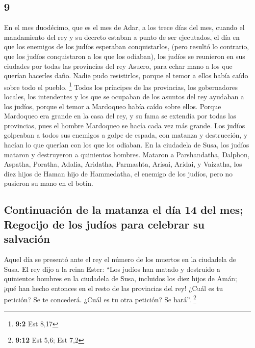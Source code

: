 \begin{paracol}{2}
\hypertarget{section-16}{%
\section{9}\label{section-16}}

 En el mes duodécimo, que es el mes de Adar, a los trece
días del mes, cuando el mandamiento del rey y su decreto estaban a punto
de ser ejecutados, el día en que los enemigos de los judíos esperaban
conquistarlos, (pero resultó lo contrario, que los judíos conquistaron a
los que los odiaban),  los judíos se reunieron en sus
ciudades por todas las provincias del rey Asuero, para echar mano a los
que querían hacerles daño. Nadie pudo resistirlos, porque el temor a
ellos había caído sobre todo el pueblo. \footnote{\textbf{9:2} Est 8,17}
 Todos los príncipes de las provincias, los gobernadores
locales, los intendentes y los que se ocupaban de los asuntos del rey
ayudaban a los judíos, porque el temor a Mardoqueo había caído sobre
ellos.  Porque Mardoqueo era grande en la casa del rey, y
su fama se extendía por todas las provincias, pues el hombre Mardoqueo
se hacía cada vez más grande.  Los judíos golpeaban a
todos sus enemigos a golpe de espada, con matanza y destrucción, y
hacían lo que querían con los que los odiaban.  En la
ciudadela de Susa, los judíos mataron y destruyeron a quinientos
hombres.  Mataron a Parshandatha, Dalphon, Aspatha,
 Poratha, Adalia, Aridatha,  Parmashta,
Arisai, Aridai, y Vaizatha,  los diez hijos de Haman hijo
de Hammedatha, el enemigo de los judíos, pero no pusieron su mano en el
botín.

\hypertarget{continuaciuxf3n-de-la-matanza-el-duxeda-14-del-mes-regocijo-de-los-juduxedos-para-celebrar-su-salvaciuxf3n}{%
\subsection{Continuación de la matanza el día 14 del mes; Regocijo de
los judíos para celebrar su
salvación}\label{continuaciuxf3n-de-la-matanza-el-duxeda-14-del-mes-regocijo-de-los-juduxedos-para-celebrar-su-salvaciuxf3n}}

 Aquel día se presentó ante el rey el número de los
muertos en la ciudadela de Susa.  El rey dijo a la reina
Ester: ``Los judíos han matado y destruido a quinientos hombres en la
ciudadela de Susa, incluidos los diez hijos de Amán; ¡qué han hecho
entonces en el resto de las provincias del rey! ¿Cuál es tu petición? Se
te concederá. ¿Cuál es tu otra petición? Se hará''. \footnote{\textbf{9:12}
  Est 5,6; Est 7,2}


\end{paracol}
